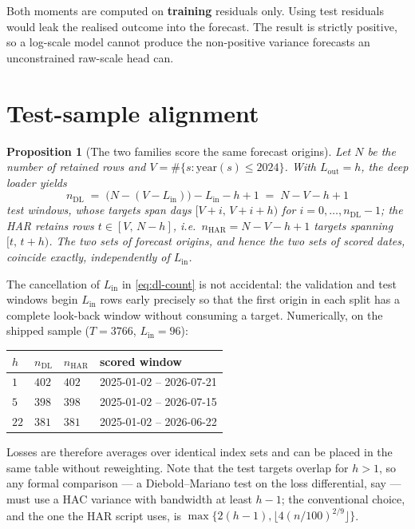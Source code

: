 \documentclass[11pt,a4paper]{article}
\newcommand{\Lin}{L_{\mathrm{in}}}
\newcommand{\Lout}{L_{\mathrm{out}}}
\newtheorem{proposition}{Proposition}
\begin{document}
Both moments are computed on \textbf{training} residuals only. Using test residuals would
leak the realised outcome into the forecast. The result is strictly positive, so a
log-scale model cannot produce the non-positive variance forecasts an unconstrained
raw-scale head can.

\section{Test-sample alignment}
\label{sec:alignment}

\begin{proposition}[The two families score the same forecast origins]
\label{prop:align}
Let $N$ be the number of retained rows and $V=\#\{s:\mathrm{year}(s)\le 2024\}$. With
$\Lout=h$, the deep loader yields
\begin{equation}
  n_{\text{DL}} \;=\; \bigl(N-(V-\Lin)\bigr)-\Lin-h+1 \;=\; N-V-h+1
  \label{eq:dl-count}
\end{equation}
test windows, whose targets span days $[V+i,\,V+i+h)$ for $i=0,\dots,n_{\text{DL}}-1$;
the HAR retains rows $t\in[V,\,N-h]$, i.e.\ $n_{\text{HAR}}=N-V-h+1$ targets spanning
$[t,\,t+h)$. The two sets of forecast origins, and hence the two sets of scored dates,
coincide exactly, independently of $\Lin$.
\end{proposition}

The cancellation of $\Lin$ in \eqref{eq:dl-count} is not accidental: the validation and test
windows begin $\Lin$ rows early precisely so that the first origin in each split has a
complete look-back window without consuming a target. Numerically, on the shipped sample
($T=3766$, $\Lin=96$):

\begin{center}
\begin{tabular}{@{}llll@{}}
\toprule
$h$ & $n_{\text{DL}}$ & $n_{\text{HAR}}$ & scored window \\
\midrule
$1$  & $402$ & $402$ & 2025-01-02 -- 2026-07-21 \\
$5$  & $398$ & $398$ & 2025-01-02 -- 2026-07-15 \\
$22$ & $381$ & $381$ & 2025-01-02 -- 2026-06-22 \\
\bottomrule
\end{tabular}
\end{center}

Losses are therefore averages over identical index sets and can be placed in the same table
without reweighting. Note that the test targets overlap for $h>1$, so any formal comparison
--- a Diebold--Mariano test on the loss differential, say --- must use a HAC variance with
bandwidth at least $h-1$; the conventional choice, and the one the HAR script uses, is
$\max\{2(h-1),\lfloor 4(n/100)^{2/9}\rfloor\}$.
\end{document}
